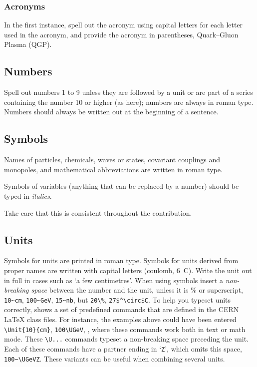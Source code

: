 \documentclass[12pt,twoside,a4paper]{cernrep}
\begin{document}
\subsubsection{Acronyms}

In the first instance, spell out the acronym using capital letters for
each letter used in the acronym, and provide the acronym in
parentheses, \eg Quark--Gluon Plasma (QGP).

\subsection{Numbers}

Spell out numbers 1 to 9 unless they are followed by a unit or are
part of a series containing the number 10 or higher (as here); numbers
are always in roman type. Numbers should always be written out at the
beginning of a sentence.

\subsection{Symbols}

Names of particles, chemicals, waves or states, covariant couplings
and monopoles, and mathematical abbreviations are written in roman
type.

Symbols of variables (\ie anything that can be replaced by a number)
should be typed in \emph{italics}.

Take care that this is consistent throughout the contribution.

\subsection{Units}

Symbols for units are printed in roman type. Symbols for units derived
from proper names are written with capital letters (\eg coulomb, 6~C).
Write the unit out in full in cases such as `a few centimetres'.  When
using symbols insert a \emph{non-breaking space} between the number
and the unit, unless it is $\%$ or superscript, \eg \verb!10~cm!,
\verb!100~GeV!, \verb!15~nb!, but \verb!20\%!, \verb!27$^\circ$C!. To
help you typeset units correctly,  shows a set of
predefined commands that are defined in the CERN \LaTeX{} class files.
For instance, the examples above could have been entered
\verb!\Unit{10}{cm}!, \verb!100\UGeV!, \etc, where these commands work
both in text or math mode. These \verb!\U...! commands typeset a
non-breaking space preceding the unit.  Each of these commands have a
partner ending in `\texttt{Z}', which omits this space, \eg
\verb!100~\UGeVZ!. These variants can be useful when combining several
units.
\end{document}
